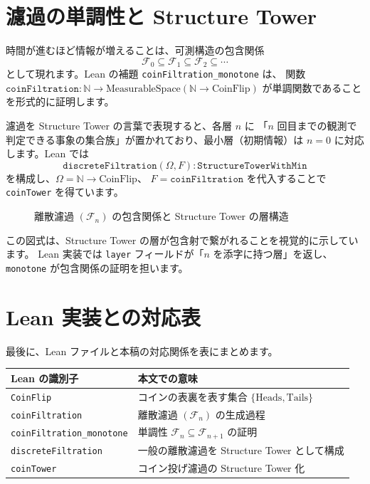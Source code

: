 \documentclass[12pt]{ltjsarticle}
\theoremstyle{definition}
\begin{document}
\section{濾過の単調性と Structure Tower}
時間が進むほど情報が増えることは、可測構造の包含関係
\[
  \mathcal{F}_0 \subseteq \mathcal{F}_1 \subseteq \mathcal{F}_2 \subseteq \cdots
\]
として現れます。Lean の補題 \texttt{coinFiltration\_monotone} は、
関数 $\texttt{coinFiltration} : \mathbb{N} \to \mathrm{MeasurableSpace}(\mathbb{N}\to\mathrm{CoinFlip})$
が単調関数であることを形式的に証明します。

濾過を Structure Tower の言葉で表現すると、各層 $n$ に
「$n$ 回目までの観測で判定できる事象の集合族」が置かれており、最小層（初期情報）は
$n=0$ に対応します。Lean では
\[
  \texttt{discreteFiltration}(\Omega,F)
  : \texttt{StructureTowerWithMin}
\]
を構成し、$\Omega = \mathbb{N} \to \mathrm{CoinFlip}$、
$F = \texttt{coinFiltration}$ を代入することで \texttt{coinTower} を得ています。

\begin{figure}[htbp]
  \centering
  \caption{離散濾過 $(\mathcal{F}_n)$ の包含関係と Structure Tower の層構造}
\end{figure}

この図式は、Structure Tower の層が包含射で繋がれることを視覚的に示しています。
Lean 実装では \texttt{layer} フィールドが「$n$ を添字に持つ層」を返し、
\texttt{monotone} が包含関係の証明を担います。

\section{Lean 実装との対応表}
最後に、Lean ファイルと本稿の対応関係を表にまとめます。

\begin{center}
\begin{tabular}{ll}
  \hline
  Lean の識別子 & 本文での意味 \\
  \hline
  \texttt{CoinFlip} & コインの表裏を表す集合 $\{ \mathrm{Heads}, \mathrm{Tails} \}$ \\
  \texttt{coinFiltration} & 離散濾過 $(\mathcal{F}_n)$ の生成過程 \\
  \texttt{coinFiltration\_monotone} & 単調性 $\mathcal{F}_n \subseteq \mathcal{F}_{n+1}$ の証明 \\
  \texttt{discreteFiltration} & 一般の離散濾過を Structure Tower として構成 \\
  \texttt{coinTower} & コイン投げ濾過の Structure Tower 化 \\
  \hline
\end{tabular}
\end{center}
\end{document}
